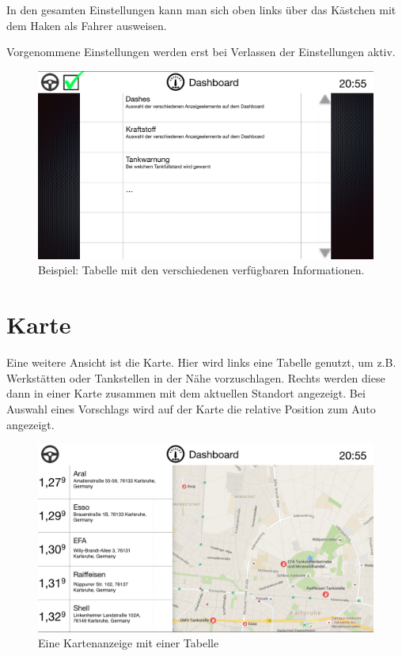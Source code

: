 \documentclass[pflichtenheft.tex]{subfiles}
\begin{document}
In den gesamten Einstellungen kann man sich oben links über das Kästchen mit dem Haken als Fahrer ausweisen.

Vorgenommene Einstellungen werden erst bei Verlassen der Einstellungen aktiv.  

\begin{figure}[H]
  	\begin{center}
 		\includegraphics[width=\textwidth]{Images/GUI-Settings.png}
  		\caption{Beispiel: Tabelle mit den verschiedenen verfügbaren Informationen.}
  	\end{center}
\end{figure}

\clearpage
\section{Karte}
\label{sec:Karte}

Eine weitere Ansicht ist die Karte. Hier wird links eine Tabelle genutzt, um z.B. Werkstätten oder Tankstellen in der Nähe vorzuschlagen. Rechts werden diese dann in einer Karte zusammen mit dem aktuellen Standort angezeigt.
Bei Auswahl eines Vorschlags wird auf der Karte die relative Position zum Auto angezeigt.
\begin{figure}[H]
  	\begin{center}
 		\includegraphics[width=\textwidth]{Images/GUI-Map.png}
  		\caption{Eine Kartenanzeige mit einer Tabelle}
  	\end{center}
\end{figure}
\end{document}
